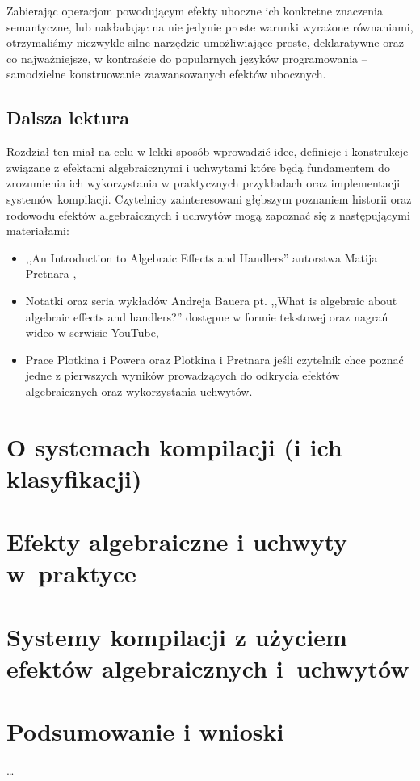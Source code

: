 \documentclass[shortabstract]{iithesis}
\begin{document}
Zabierając operacjom powodującym efekty uboczne ich konkretne znaczenia semantyczne, lub nakładając na nie jedynie proste warunki wyrażone równaniami, otrzymaliśmy niezwykle silne narzędzie umożliwiające proste, deklaratywne oraz -- co najważniejsze, w kontraście do popularnych języków programowania -- samodzielne konstruowanie zaawansowanych efektów ubocznych.

\section{Dalsza lektura}

Rozdział ten miał na celu w lekki sposób wprowadzić idee, definicje i konstrukcje związane z efektami algebraicznymi i uchwytami które będą fundamentem do zrozumienia ich wykorzystania w praktycznych przykładach oraz implementacji systemów kompilacji. Czytelnicy zainteresowani głębszym poznaniem historii oraz rodowodu efektów algebraicznych i uchwytów mogą zapoznać się z następującymi materiałami:

\begin{itemize}
\item ,,An Introduction to Algebraic Effects and Handlers'' autorstwa Matija Pretnara \cite{pretnar2015introduction},
\item Notatki oraz seria wykładów Andreja Bauera pt. ,,What is algebraic about algebraic effects and handlers?'' \cite{bauer2018algebraic} dostępne w formie tekstowej oraz nagrań wideo w serwisie YouTube,
\item Prace Plotkina i Powera \cite{plotkin2001semantics, plotkin2002computational} oraz Plotkina i Pretnara \cite{plotkin2013handling} jeśli czytelnik chce poznać jedne z pierwszych wyników prowadzących do odkrycia efektów algebraicznych oraz wykorzystania uchwytów.

\end{itemize}

\chapter{O systemach kompilacji (i ich klasyfikacji)}

\chapter{Efekty algebraiczne i uchwyty w~praktyce}

\chapter{Systemy kompilacji z użyciem efektów algebraicznych i~uchwytów}

\chapter{Podsumowanie i wnioski}

\ldots


\nocite{biernacki2017handle}
\nocite{biernacki2019abstracting}
\nocite{biernacki2019binders}
\nocite{pretnar2015introduction}



\end{document}
